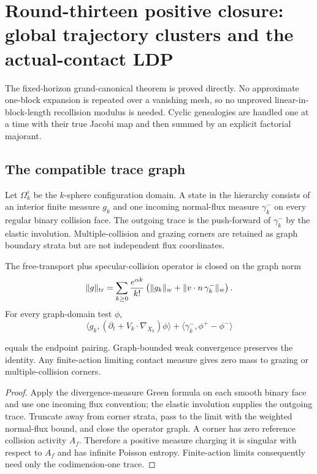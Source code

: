 \section{Round-thirteen positive closure: global trajectory clusters and the actual-contact LDP}
\label{sec:r13-b2}

The fixed-horizon grand-canonical theorem is proved directly.  No approximate
one-block expansion is repeated over a vanishing mesh, so no unproved
linear-in-block-length recollision modulus is needed.  Cyclic genealogies are
handled one at a time with their true Jacobi map and then summed by an explicit
factorial majorant.

\subsection{The compatible trace graph}

Let $\Omega_k^\varepsilon$ be the $k$-sphere configuration domain.  A state in
the hierarchy consists of an interior finite measure $g_k$ and one incoming
normal-flux measure $\gamma_k^-$ on every regular binary collision face.  The
outgoing trace is the push-forward of $\gamma_k^-$ by the elastic involution.
Multiple-collision and grazing corners are retained as graph boundary strata
but are not independent flux coordinates.

\begin{theorem}
\label{thm:r13-b2-trace}
The free-transport plus specular-collision operator is closed on the graph
norm
\[
 \|g\|_{\rm tr}=
 \sum_{k\ge0}{e^{\alpha k}\over k!}
 \left(\|g_k\|_w+
       \|v\cdot n\,\gamma_k^-\|_w\right).
\]
For every graph-domain test $\phi$,
\[
 \langle g_k,(\partial_t+V_k\cdot\nabla_{X_k})\phi\rangle
 +\langle\gamma_k^-,\phi^+-\phi^-\rangle
\]

equals the endpoint pairing.  Graph-bounded weak convergence preserves the
identity.  Any finite-action limiting contact measure gives zero mass to
grazing or multiple-collision corners.
\end{theorem}

\begin{proof}
Apply the divergence-measure Green formula on each smooth binary face and use
one incoming flux convention; the elastic involution supplies the outgoing
trace.  Truncate away from corner strata, pass to the limit with the weighted
normal-flux bound, and close the operator graph.  A corner has zero reference
collision activity $A_f$.  Therefore a positive measure charging it is
singular with respect to $A_f$ and has infinite Poisson entropy.  Finite-action
limits consequently need only the codimension-one trace.
\end{proof}

